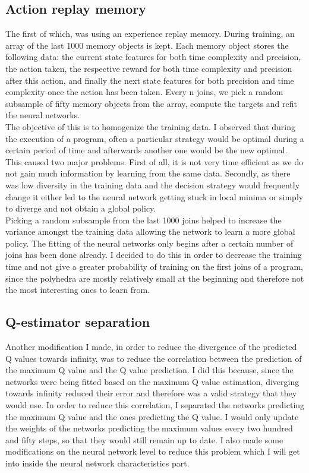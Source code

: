 \subsection{Action replay memory}
The first of which, was using an experience replay memory. During training, an array of the last 1000 memory objects is kept. Each memory object stores the following data: the current state features for both time complexity and precision, the action taken, the respective reward for both time complexity and precision after this action, and finally the next state features for both precision and time complexity once the action has been taken. Every n joins, we pick a random subsample of fifty memory objects from the array, compute the targets and refit the neural networks.\\
The objective of this is to homogenize the training data. I observed that during the execution of a program, often a particular strategy would be optimal during a certain period of time and afterwards another one would be the new optimal. This caused two major problems. First of all, it is not very time efficient as we do not gain much information by learning from the same data. Secondly, as there was low diversity in the training data and the decision strategy would frequently change it either led to the neural network getting stuck in local minima or simply to diverge and not obtain a global policy. \\
Picking a random subsample from the last 1000 joins helped to increase the variance amongst the training data allowing the network to learn a more global policy. 
The fitting of the neural networks only begins after a certain number of joins has been done already. I decided to do this in order to decrease the training time and not give a greater probability of training on the first joins of a program, since the polyhedra are mostly relatively small at the beginning and therefore not the most interesting ones to learn from.
\subsection{Q-estimator separation}
Another modification I made, in order to reduce the divergence of the predicted Q values towards infinity, was to reduce the correlation between the prediction of the maximum Q value and the Q value prediction. I did this because, since the networks were being fitted based on the maximum Q value estimation, diverging towards infinity reduced their error and therefore was a valid strategy that they would use. In order to reduce this correlation, I separated the networks predicting the maximum Q value and the ones predicting the Q value. I would only update the weights of the networks predicting the maximum values every two hundred and fifty steps, so that they would still remain up to date. I also made some modifications on the neural network level to reduce this problem which I will get into inside the neural network characteristics part.


